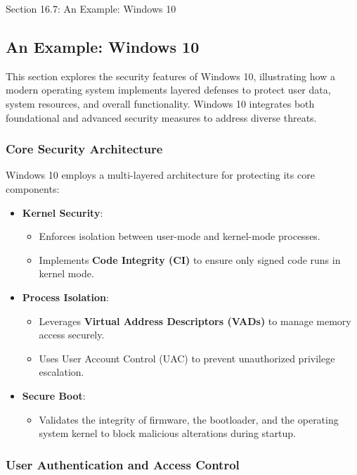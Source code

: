 \begin{notes}{Section 16.7: An Example: Windows 10}
    \subsection*{An Example: Windows 10}

    This section explores the security features of Windows 10, illustrating how a modern operating system implements layered defenses to protect user data, system resources, and overall functionality. 
    Windows 10 integrates both foundational and advanced security measures to address diverse threats.
    
    \subsubsection*{Core Security Architecture}
    
    Windows 10 employs a multi-layered architecture for protecting its core components:
    \begin{itemize}
        \item \textbf{Kernel Security}:
        \begin{itemize}
            \item Enforces isolation between user-mode and kernel-mode processes.
            \item Implements \textbf{Code Integrity (CI)} to ensure only signed code runs in kernel mode.
        \end{itemize}
        \item \textbf{Process Isolation}:
        \begin{itemize}
            \item Leverages \textbf{Virtual Address Descriptors (VADs)} to manage memory access securely.
            \item Uses User Account Control (UAC) to prevent unauthorized privilege escalation.
        \end{itemize}
        \item \textbf{Secure Boot}:
        \begin{itemize}
            \item Validates the integrity of firmware, the bootloader, and the operating system kernel to block malicious alterations during startup.
        \end{itemize}
    \end{itemize}
    
    \subsubsection*{User Authentication and Access Control}
    

\end{notes}
